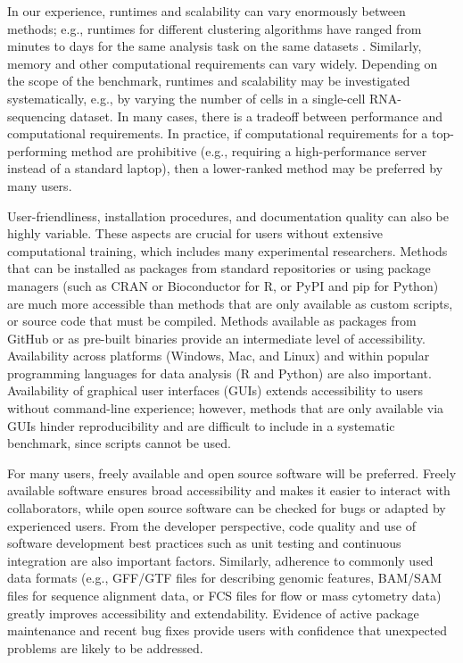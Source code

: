 \documentclass[12pt, a4paper]{article}
\begin{document}
In our experience, runtimes and scalability can vary enormously between methods; e.g., runtimes for different clustering algorithms have ranged from minutes to days for the same analysis task on the same datasets \citep{Weber2016}. Similarly, memory and other computational requirements can vary widely. Depending on the scope of the benchmark, runtimes and scalability may be investigated systematically, e.g., by varying the number of cells in a single-cell RNA-sequencing dataset. In many cases, there is a tradeoff between performance and computational requirements. In practice, if computational requirements for a top-performing method are prohibitive (e.g., requiring a high-performance server instead of a standard laptop), then a lower-ranked method may be preferred by many users.

User-friendliness, installation procedures, and documentation quality can also be highly variable. These aspects are crucial for users without extensive computational training, which includes many experimental researchers. Methods that can be installed as packages from standard repositories or using package managers (such as CRAN or Bioconductor for R, or PyPI and pip for Python) are much more accessible than methods that are only available as custom scripts, or source code that must be compiled. Methods available as packages from GitHub or as pre-built binaries provide an intermediate level of accessibility. Availability across platforms (Windows, Mac, and Linux) and within popular programming languages for data analysis (R and Python) are also important. Availability of graphical user interfaces (GUIs) extends accessibility to users without command-line experience; however, methods that are only available via GUIs hinder reproducibility and are difficult to include in a systematic benchmark, since scripts cannot be used.

For many users, freely available and open source software will be preferred. Freely available software ensures broad accessibility and makes it easier to interact with collaborators, while open source software can be checked for bugs or adapted by experienced users. From the developer perspective, code quality and use of software development best practices such as unit testing and continuous integration are also important factors. Similarly, adherence to commonly used data formats (e.g., GFF/GTF files for describing genomic features, BAM/SAM files for sequence alignment data, or FCS files for flow or mass cytometry data) greatly improves accessibility and extendability. Evidence of active package maintenance and recent bug fixes provide users with confidence that unexpected problems are likely to be addressed.
\end{document}
